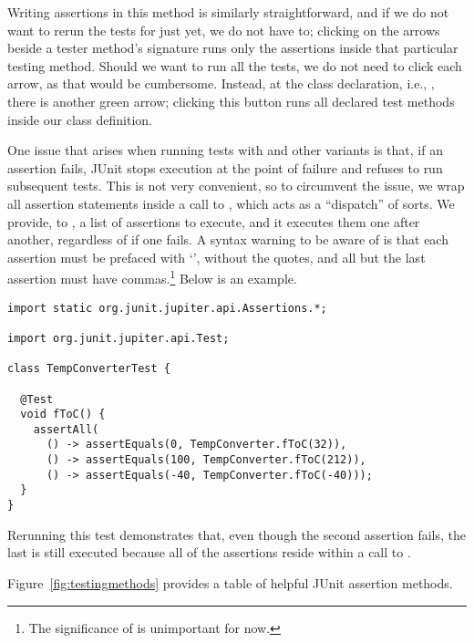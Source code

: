 Writing assertions in this method is similarly straightforward, and if we do not want to rerun the tests for  just yet, we do not have to; clicking on the arrows beside a tester method's signature runs only the assertions inside that particular testing method. 
Should we want to run all the tests, we do not need to click each arrow, as that would be cumbersome. 
Instead, at the class declaration, i.e., , there is another green arrow; clicking this button runs all declared test methods inside our class definition.

One issue that arises when running tests with  and other variants is that, if an assertion fails, JUnit stops execution at the point of failure and refuses to run subsequent tests.
This is not very convenient, so to circumvent the issue, we wrap all assertion statements inside a call to , which acts as a ``dispatch'' of sorts. 
We provide, to , a list of assertions to execute, and it executes them one after another, regardless of if one fails. 
A syntax warning to be aware of is that each assertion must be prefaced with `\ttt{() -> }', without the quotes, and all but the last assertion must have commas.\footnote{The significance of \ttt{() ->} is unimportant for now.} 
Below is an example.

\begin{lstlisting}[language=MyJava]
import static org.junit.jupiter.api.Assertions.*;

import org.junit.jupiter.api.Test;
  
class TempConverterTest {

  @Test
  void fToC() {
    assertAll(
      () -> assertEquals(0, TempConverter.fToC(32)),
      () -> assertEquals(100, TempConverter.fToC(212)),
      () -> assertEquals(-40, TempConverter.fToC(-40)));
  }
}
\end{lstlisting}
Rerunning this test demonstrates that, even though the second assertion fails, the last is still executed because all of the assertions reside within a call to . 

Figure~\ref{fig:testingmethods} provides a table of helpful JUnit assertion methods.

